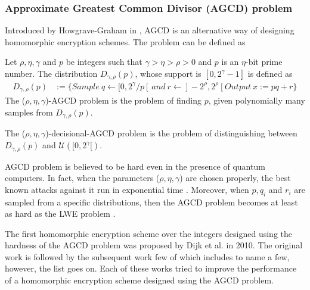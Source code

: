 \subsubsection{Approximate Greatest Common Divisor (AGCD) problem} Introduced by Howgrave-Graham in \cite{howgrave2001approximate}, AGCD is an alternative way of designing homomorphic encryption schemes. The problem can be defined as %
\begin{definition}
    Let $\rho,\eta,\gamma$ and $p$ be integers such that $\gamma > \eta > \rho > 0$ and $p$ is an $\eta$-bit prime number. The distribution $D_{\gamma,\rho}(p)$, whose support is $[0, 2^{\gamma}-1]$ is defined as
    \begin{align*}
        D_{\gamma,\rho}(p) & := \{Sample\ q \leftarrow [0, 2^{\gamma}/p[ \ and\ r \leftarrow ]-2^{\rho},2^{\rho}\ [\ Output\ x := pq + r\}
    \end{align*}
    The ($\rho, \eta, \gamma$)-AGCD problem is the problem of finding $p$, given polynomially many samples from $D_{\gamma,\rho}(p)$.

    The ($\rho,\eta,\gamma$)-decisional-AGCD problem is the problem of distinguishing between $D_{\gamma,\rho}(p)$ and $\mathcal{U}([0, 2^{\gamma}[)$.
\end{definition}

AGCD problem is believed to be hard even in the presence of quantum computers. In fact, when the parameters ($\rho,\eta,\gamma$) are chosen properly, the best known attacks against it run in exponential time \cite{galbraith2016algorithms}. Moreover, when $p,q_i$ and $r_i$ are sampled from a specific distributions, then the AGCD problem becomes at least as hard as the LWE problem \cite{cheon2015fully}.

The first homomorphic encryption scheme over the integers designed using the hardness of the AGCD problem was proposed by Dijk et al. \cite{van2010fully} in 2010. The original work is followed by the subsequent work few of which includes \cite{cheon2013batch,coron2014scale,cheon2015fully,benarroch2017fhe,pereira2020efficient} to name a few, however, the list goes on. Each of these works tried to improve the performance of a homomorphic encryption scheme designed using the AGCD problem.



